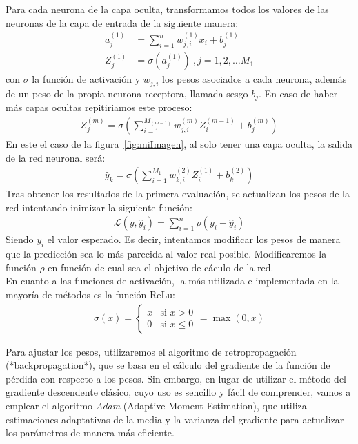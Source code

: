 \documentclass[11pt]{book}
\theoremstyle{plain} %
\theoremstyle{definition} %
\begin{document}
Para cada neurona de la capa oculta, transformamos todos los valores de las neuronas 
de la capa de entrada de la siguiente manera:
\begin{align*}
    a_j^{(1)} &= \sum_{i=1}^n w_{j,i}^{(1)}x_i+b_{j}^{(1)}\\
    Z_j^{(1)} &= \sigma(a_j^{(1)})\:, j = 1, 2, \dots M_1
\end{align*}
con $\sigma$ la función de activación y $w_{j,i}$ los pesos asociados a cada neurona, 
además de un peso de la propia neurona receptora, llamada sesgo $b_{j}$. En caso de 
haber más  capas ocultas repitiriamos este proceso:
\begin{align*}
    Z_j^{(m)} = \sigma\left(\sum_{i = 1}^{M_{(m-1)}}w_{j,i}^{(m)}Z_i^{(m-1)}+b_{j}^{(m)}\right)
\end{align*}
En este el caso de la figura~\ref{fig:miImagen}, al solo tener una capa oculta, la salida de la red 
neuronal será:
\begin{align*}
\hat{y}_k = \sigma\left(\sum_{i=1}^{M_1} w_{k,i}^{(2)}Z_i^{(1)}+b_{k}^{(2)}\right)
\end{align*}
Tras obtener los resultados de la primera evaluación, se actualizan los pesos de la 
red intentando inimizar la siguiente función:
\begin{align*}
   \mathcal{L}(y, \hat{y}_i) = \sum_{i=1}^n \rho(y_i - \hat{y}_i)
\end{align*}
Siendo $y_i$ el valor esperado. Es decir, intentamos modificar los pesos de manera que 
la predicción sea lo más parecida al valor real posible. Modificaremos la función $\rho$ 
en función de cual sea el objetivo de cáculo de la red. \\

En cuanto a las funciones de activación, la más utilizada e implementada en la mayoría 
de métodos es la función ReLu:
\begin{align*}
      \sigma(x) = 
      \begin{cases}
         x & \text{si } x > 0 \\
         0 & \text{si } x \leq 0
      \end{cases} = \max(0, x)
\end{align*}


Para ajustar los pesos, utilizaremos el algoritmo de retropropagación (*backpropagation*), que 
se basa en el cálculo del gradiente de la función de pérdida con respecto a los pesos.
Sin embargo, en lugar de utilizar el método del gradiente descendente clásico, cuyo uso es sencillo 
y fácil de comprender, vamos a emplear el algoritmo \textit{Adam} (Adaptive Moment Estimation), 
que utiliza estimaciones adaptativas de la media y la varianza del gradiente para actualizar los 
parámetros de manera más eficiente.
\end{document}

